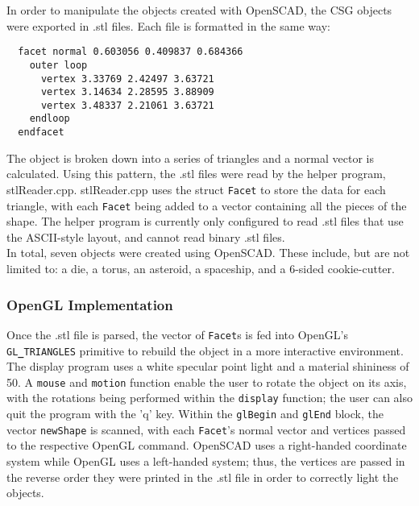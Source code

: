 \documentclass[12pt]{article}
\begin{document}
\begin{doublespace}
In order to manipulate the objects created with OpenSCAD, the CSG objects were exported in .stl files. Each file is formatted in the same way:
\begin{lstlisting}
  facet normal 0.603056 0.409837 0.684366
    outer loop
      vertex 3.33769 2.42497 3.63721
      vertex 3.14634 2.28595 3.88909
      vertex 3.48337 2.21061 3.63721
    endloop
  endfacet
\end{lstlisting}
The object is broken down into a series of triangles and a normal vector is calculated. Using this pattern, the .stl files were read by the helper program, stlReader.cpp. stlReader.cpp uses the struct \texttt{Facet} to store the data for each triangle, with each \texttt{Facet} being added to a vector containing all the pieces of the shape. The helper program is currently only configured to read .stl files that use the ASCII-style layout, and cannot read binary .stl files.\\

In total, seven objects were created using OpenSCAD. These include, but are not limited to: a die, a torus, an asteroid, a spaceship, and a 6-sided cookie-cutter.
\subsubsection{OpenGL Implementation}
Once the .stl file is parsed, the vector of \texttt{Facet}s is fed into OpenGL's \texttt{GL{\bf\_}TRIANGLES} primitive to rebuild the object in a more interactive environment. The display program uses a white specular point light and a material shininess of 50. A \texttt{mouse} and \texttt{motion} function enable the user to rotate the object on its axis, with the rotations being performed within the \texttt{display} function; the user can also quit the program with the 'q' key. Within the \texttt{glBegin} and \texttt{glEnd} block, the vector \texttt{newShape} is scanned, with each \texttt{Facet}'s normal vector and vertices passed to the respective OpenGL command. OpenSCAD uses a right-handed coordinate system while OpenGL uses a left-handed system; thus, the vertices are passed in the reverse order they were printed in the .stl file in order to correctly light the objects.

\end{doublespace}
\end{document}

